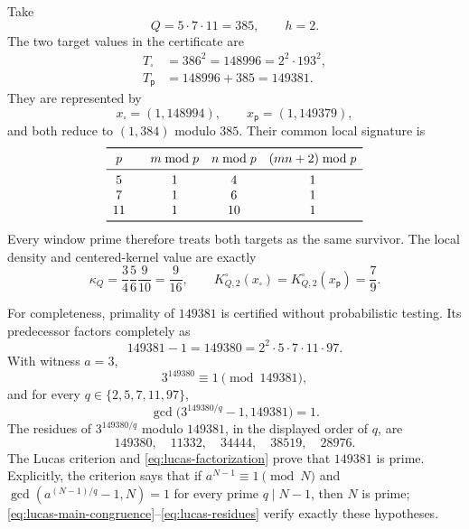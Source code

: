 Take
\begin{equation}\label{eq:certificate-parameters}
 Q=5\cdot7\cdot11=385,
 \qquad h=2.
\end{equation}
The two target values in the certificate are
\begin{align}
 T_\square&=386^2=148996=2^2\cdot193^2,
 \label{eq:certificate-square}\\
 T_{\mathsf p}&=148996+385=149381.
 \label{eq:certificate-prime}
\end{align}
They are represented by
\begin{equation}\label{eq:certificate-atoms}
 x_\square=(1,148994),
 \qquad
 x_{\mathsf p}=(1,149379),
\end{equation}
and both reduce to $(1,384)$ modulo $385$.  Their common local signature is
\begin{equation}\label{eq:certificate-signature}
\begin{array}{c@{\qquad}ccc}
\toprule
p&m\bmod p&n\bmod p&(mn+2)\bmod p\\
\midrule
5&1&4&1\\
7&1&6&1\\
11&1&10&1\\
\bottomrule
\end{array}
\end{equation}
Every window prime therefore treats both targets as the same survivor.  The
local density and centered-kernel value are exactly
\begin{equation}\label{eq:certificate-kernel-values}
 \kappa_Q=\frac34\frac56\frac9{10}=\frac9{16},
 \qquad
 K_{Q,2}^{\circ}(x_\square)
 =K_{Q,2}^{\circ}(x_{\mathsf p})
 =\frac79.
\end{equation}

For completeness, primality of $149381$ is certified without probabilistic
testing.  Its predecessor factors completely as
\begin{equation}\label{eq:lucas-factorization}
 149381-1=149380=2^2\cdot5\cdot7\cdot11\cdot97.
\end{equation}
With witness $a=3$,
\begin{equation}\label{eq:lucas-main-congruence}
 3^{149380}\equiv1\pmod{149381},
\end{equation}
and for every $q\in\{2,5,7,11,97\}$,
\begin{equation}\label{eq:lucas-gcd-condition}
 \gcd\bigl(3^{149380/q}-1,149381\bigr)=1.
\end{equation}
The residues of $3^{149380/q}$ modulo $149381$, in the displayed order of
$q$, are
\begin{equation}\label{eq:lucas-residues}
 149380,\quad11332,\quad34444,\quad38519,\quad28976.
\end{equation}
The Lucas criterion and \eqref{eq:lucas-factorization} prove that $149381$
is prime.  Explicitly, the criterion says that if
$a^{N-1}\equiv1\pmod N$ and
$\gcd(a^{(N-1)/q}-1,N)=1$ for every prime $q\mid N-1$, then $N$ is prime;
\eqref{eq:lucas-main-congruence}--\eqref{eq:lucas-residues} verify exactly
these hypotheses.

